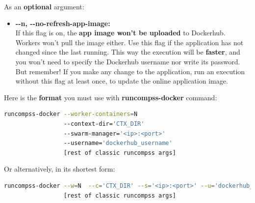 As an \textbf{optional} argument:
\begin{itemize}
 \item { 
 \textbf{-{}-n, -{}-no-refresh-app-image:} \\
 If this flag is on, the \textbf{app image won't be uploaded }to Dockerhub.
 Workers won't pull the image either.
 Use this flag if the application has not changed since the last running.
 This way the execution will be \textbf{faster}, and you won't need to specify the Dockerhub username nor write its password.
 But remember! If you make any change to the application, run an execution without this flag at least once, 
 to update the online application image.
 }
\end{itemize}

Here is the \textbf{format} you must use with \textbf{runcompss-docker} command:
\begin{lstlisting}[language=bash]
runcompss-docker --worker-containers=N 
                 --context-dir='CTX_DIR'
                 --swarm-manager='<ip>:<port>'
                 --username='dockerhub_username'
                 [rest of classic runcompss args]
\end{lstlisting}           

Or alternatively, in its shortest form:
\begin{lstlisting}[language=bash]
runcompss-docker --w=N  --c='CTX_DIR' --s='<ip>:<port>' --u='dockerhub_username' 
                 [rest of classic runcompss args]
\end{lstlisting}        

